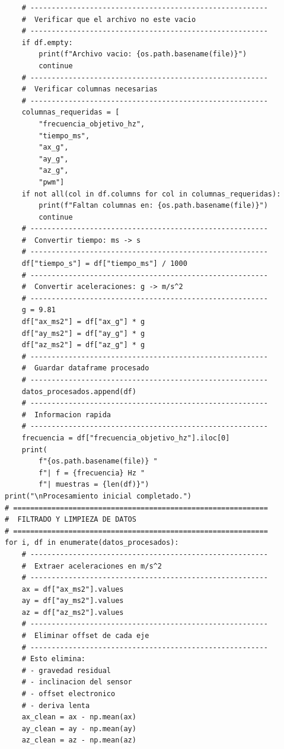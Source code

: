 \documentclass[10pt]{article}
\begin{document}
\begin{lstlisting}
    # --------------------------------------------------------
    #  Verificar que el archivo no este vacio
    # --------------------------------------------------------
    if df.empty:
        print(f"Archivo vacio: {os.path.basename(file)}")
        continue
    # --------------------------------------------------------
    #  Verificar columnas necesarias
    # --------------------------------------------------------
    columnas_requeridas = [
        "frecuencia_objetivo_hz",
        "tiempo_ms",
        "ax_g",
        "ay_g",
        "az_g",
        "pwm"]
    if not all(col in df.columns for col in columnas_requeridas):
        print(f"Faltan columnas en: {os.path.basename(file)}")
        continue
    # --------------------------------------------------------
    #  Convertir tiempo: ms -> s
    # --------------------------------------------------------
    df["tiempo_s"] = df["tiempo_ms"] / 1000
    # --------------------------------------------------------
    #  Convertir aceleraciones: g -> m/s^2
    # --------------------------------------------------------
    g = 9.81
    df["ax_ms2"] = df["ax_g"] * g
    df["ay_ms2"] = df["ay_g"] * g
    df["az_ms2"] = df["az_g"] * g
    # --------------------------------------------------------
    #  Guardar dataframe procesado
    # --------------------------------------------------------
    datos_procesados.append(df)
    # --------------------------------------------------------
    #  Informacion rapida
    # --------------------------------------------------------
    frecuencia = df["frecuencia_objetivo_hz"].iloc[0]
    print(
        f"{os.path.basename(file)} "
        f"| f = {frecuencia} Hz "
        f"| muestras = {len(df)}")
print("\nProcesamiento inicial completado.")
# ============================================================
#  FILTRADO Y LIMPIEZA DE DATOS
# ============================================================
for i, df in enumerate(datos_procesados):
    # --------------------------------------------------------
    #  Extraer aceleraciones en m/s^2
    # --------------------------------------------------------
    ax = df["ax_ms2"].values
    ay = df["ay_ms2"].values
    az = df["az_ms2"].values
    # --------------------------------------------------------
    #  Eliminar offset de cada eje
    # --------------------------------------------------------
    # Esto elimina:
    # - gravedad residual
    # - inclinacion del sensor
    # - offset electronico
    # - deriva lenta
    ax_clean = ax - np.mean(ax)
    ay_clean = ay - np.mean(ay)
    az_clean = az - np.mean(az)

\end{lstlisting}
\end{document}
